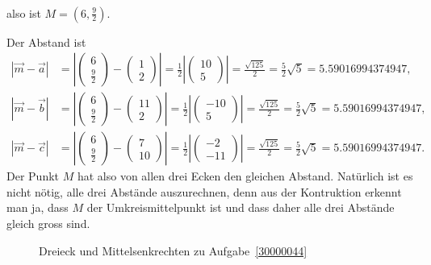 \begin{loesung}
\begin{teilaufgaben}
\begin{align*}
\end{align*}
also ist $M=(6,\frac92)$.
%
%
\item
Der Abstand ist
\begin{align*}
|\vec{m}-\vec{a}|
&=
\left|\begin{pmatrix}6\\\frac92\end{pmatrix}-\begin{pmatrix}1\\2\end{pmatrix}\right|
=
\frac12\left|\begin{pmatrix}10\\5\end{pmatrix}\right|
=
\frac{\sqrt{125}}2=\frac52\sqrt{5}
= 5.59016994374947,
\\
|\vec{m}-\vec{b}|
&=
\left|\begin{pmatrix}6\\\frac92\end{pmatrix}-\begin{pmatrix}11\\2\end{pmatrix}\right|
=
\frac12\left|\begin{pmatrix}-10\\5\end{pmatrix}\right|
=
\frac{\sqrt{125}}2=\frac52\sqrt{5}
= 5.59016994374947,
\\
|\vec{m}-\vec{c}|
&=
\left|\begin{pmatrix}6\\\frac92\end{pmatrix}-\begin{pmatrix}7\\10\end{pmatrix}\right|
=
\frac12\left|\begin{pmatrix}-2\\-11\end{pmatrix}\right|
=
\frac{\sqrt{125}}2=\frac52\sqrt{5}
= 5.59016994374947.
\end{align*}
Der Punkt $M$ hat also von allen drei Ecken den gleichen Abstand.
Natürlich ist es nicht nötig, alle drei Abstände auszurechnen, denn
aus der Kontruktion erkennt man ja, dass $M$ der Umkreismittelpunkt ist
und dass daher alle drei Abstände gleich gross sind.
\qedhere
\end{teilaufgaben}
\begin{figure}
\centering
{}
\caption{Dreieck und Mittelsenkrechten zu Aufgabe~\ref{30000044}
\label{30000044:dreieck}}
\end{figure}
\end{loesung}

